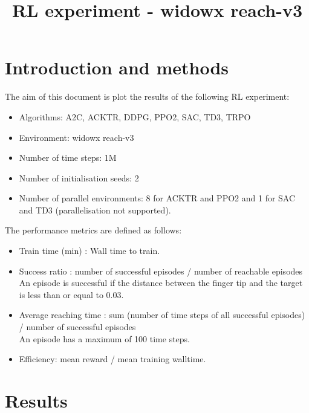 \documentclass{article}
\title{RL experiment - widowx reach-v3}
\date{}
\begin{document}
\maketitle





\section{Introduction and methods}


The aim of this document is plot the results of the following RL experiment:

\begin{itemize}
  \item Algorithms: A2C, ACKTR, DDPG, PPO2, SAC, TD3, TRPO 
  \item Environment: widowx reach-v3
  \item Number of time steps: 1M
  \item Number of initialisation seeds: 2
  \item Number of parallel environments: 8 for ACKTR and PPO2 and 1 for SAC and TD3 (parallelisation not supported).
\end{itemize}


The performance metrics are defined as follows:

\begin{itemize}
  \item Train time (min) : Wall time to train.
  \item Success ratio : number of successful episodes / number of reachable episodes \\ 
An episode is successful if the distance between the finger tip and the target is less than or equal to 0.03. \\ 
  \item Average reaching time : sum (number of time steps of all successful episodes) /  number of successful episodes \\ 
An episode has a maximum of 100 time steps.
  \item Efficiency: mean reward / mean training walltime. 
\end{itemize}



\section{Results}
\end{document}
